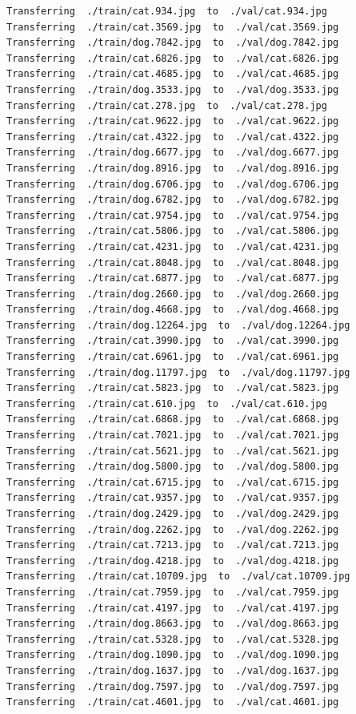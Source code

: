 \documentclass[]{book}
\theoremstyle{definition}
\theoremstyle{definition}
\theoremstyle{definition}
\theoremstyle{remark}
\begin{document}
\begin{verbatim}
Transferring  ./train/cat.934.jpg  to  ./val/cat.934.jpg
Transferring  ./train/cat.3569.jpg  to  ./val/cat.3569.jpg
Transferring  ./train/dog.7842.jpg  to  ./val/dog.7842.jpg
Transferring  ./train/cat.6826.jpg  to  ./val/cat.6826.jpg
Transferring  ./train/cat.4685.jpg  to  ./val/cat.4685.jpg
Transferring  ./train/dog.3533.jpg  to  ./val/dog.3533.jpg
Transferring  ./train/cat.278.jpg  to  ./val/cat.278.jpg
Transferring  ./train/cat.9622.jpg  to  ./val/cat.9622.jpg
Transferring  ./train/cat.4322.jpg  to  ./val/cat.4322.jpg
Transferring  ./train/dog.6677.jpg  to  ./val/dog.6677.jpg
Transferring  ./train/dog.8916.jpg  to  ./val/dog.8916.jpg
Transferring  ./train/dog.6706.jpg  to  ./val/dog.6706.jpg
Transferring  ./train/dog.6782.jpg  to  ./val/dog.6782.jpg
Transferring  ./train/cat.9754.jpg  to  ./val/cat.9754.jpg
Transferring  ./train/cat.5806.jpg  to  ./val/cat.5806.jpg
Transferring  ./train/cat.4231.jpg  to  ./val/cat.4231.jpg
Transferring  ./train/cat.8048.jpg  to  ./val/cat.8048.jpg
Transferring  ./train/cat.6877.jpg  to  ./val/cat.6877.jpg
Transferring  ./train/dog.2660.jpg  to  ./val/dog.2660.jpg
Transferring  ./train/dog.4668.jpg  to  ./val/dog.4668.jpg
Transferring  ./train/dog.12264.jpg  to  ./val/dog.12264.jpg
Transferring  ./train/cat.3990.jpg  to  ./val/cat.3990.jpg
Transferring  ./train/cat.6961.jpg  to  ./val/cat.6961.jpg
Transferring  ./train/dog.11797.jpg  to  ./val/dog.11797.jpg
Transferring  ./train/cat.5823.jpg  to  ./val/cat.5823.jpg
Transferring  ./train/cat.610.jpg  to  ./val/cat.610.jpg
Transferring  ./train/cat.6868.jpg  to  ./val/cat.6868.jpg
Transferring  ./train/cat.7021.jpg  to  ./val/cat.7021.jpg
Transferring  ./train/cat.5621.jpg  to  ./val/cat.5621.jpg
Transferring  ./train/dog.5800.jpg  to  ./val/dog.5800.jpg
Transferring  ./train/cat.6715.jpg  to  ./val/cat.6715.jpg
Transferring  ./train/cat.9357.jpg  to  ./val/cat.9357.jpg
Transferring  ./train/dog.2429.jpg  to  ./val/dog.2429.jpg
Transferring  ./train/dog.2262.jpg  to  ./val/dog.2262.jpg
Transferring  ./train/cat.7213.jpg  to  ./val/cat.7213.jpg
Transferring  ./train/dog.4218.jpg  to  ./val/dog.4218.jpg
Transferring  ./train/cat.10709.jpg  to  ./val/cat.10709.jpg
Transferring  ./train/cat.7959.jpg  to  ./val/cat.7959.jpg
Transferring  ./train/cat.4197.jpg  to  ./val/cat.4197.jpg
Transferring  ./train/dog.8663.jpg  to  ./val/dog.8663.jpg
Transferring  ./train/cat.5328.jpg  to  ./val/cat.5328.jpg
Transferring  ./train/dog.1090.jpg  to  ./val/dog.1090.jpg
Transferring  ./train/dog.1637.jpg  to  ./val/dog.1637.jpg
Transferring  ./train/dog.7597.jpg  to  ./val/dog.7597.jpg
Transferring  ./train/cat.4601.jpg  to  ./val/cat.4601.jpg

\end{verbatim}
\end{document}
